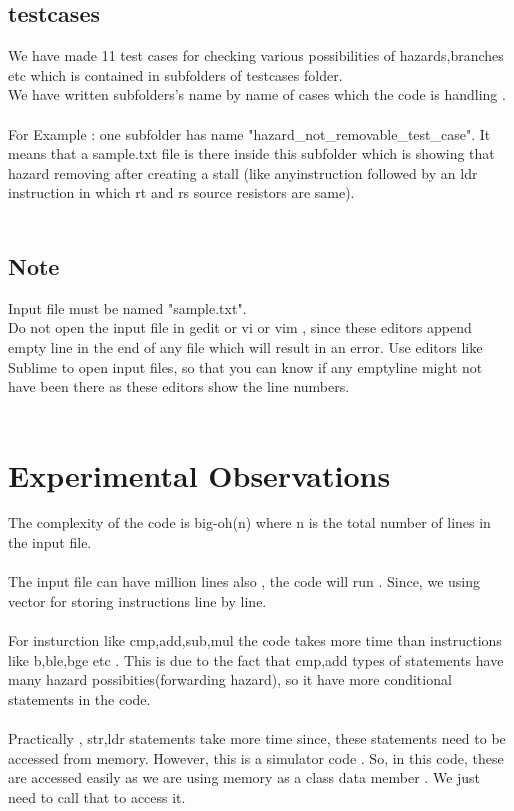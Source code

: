 \documentclass{scrreprt}
\begin{document}
\section{testcases}
$ $
\\
We have made 11 test cases for checking various possibilities of hazards,branches etc which is contained in subfolders of testcases folder.
\\
We have written subfolders's name by name of cases which the code is handling . 
\\
\\ 
For Example : one subfolder has name "hazard_not_removable_test_case". It means that a sample.txt file is there inside this subfolder which is showing that hazard removing after creating a stall (like anyinstruction followed by an ldr instruction in which rt and rs source resistors are same). 
\\
\\
$ $
\section{Note}
$ $
\\
Input file must be named "sample.txt".
\\
Do not open the input file in gedit or vi or vim , since these editors append empty line in the end of any file which will result in an error. Use editors like Sublime to open input files, so that you can know if any emptyline might not have been there as these editors show the line numbers.
\\  
\\
$ $
\chapter{Experimental Observations}
$ $
\\
The complexity of the code is big-oh(n) where n is the total number of lines in the input file.
\\
\\
The input file can have million lines also , the code will run . Since, we using vector for storing instructions line by line.
\\
\\
For insturction like cmp,add,sub,mul the code takes more time than instructions like b,ble,bge etc . This is due to the fact that cmp,add types of statements have many hazard possibities(forwarding hazard), so it have more conditional statements in the code.
\\
\\
Practically , str,ldr statements take more time since, these statements need to be accessed from memory. However, this is a simulator code . So, in this code, these are accessed easily as we are using memory as a class data member . We just need to call that to access it.
\\
$ $
\end{document}

